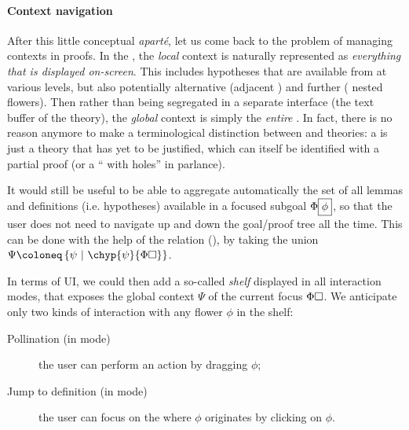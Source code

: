 \begin{scope}
\paragraph{Context navigation}

After this little conceptual \textit{aparté}, let us come back to the problem of
managing contexts in proofs. In the , the \emph{local} context is
naturally represented as \emph{everything that is displayed on-screen}. This
includes hypotheses that are available from  at various levels, but also
potentially alternative  (adjacent ) and further  (
nested flowers). Then rather than being segregated in a separate interface (the
text buffer of the theory), the \emph{global} context is simply the
\emph{entire} . In fact, there is no reason anymore to make a terminological
distinction between  and theories: a  is just a theory that has yet to
be justified, which can itself be identified with a partial proof (or a `` with holes'' in  parlance).

It would still be useful to be able to aggregate automatically the set of all
lemmas and definitions (i.e. hypotheses) available in a focused subgoal
$\Phi\fbox{$\phi$}$, so that the user does not need to navigate up and down the
goal/proof tree all the time. This can be done with the help of the 
relation (), by taking the union $\Psi \deq
\compr{\psi}{\chyp{\psi}{\Phi\hole}}$.

In terms of UI, we could then add a so-called \emph{shelf} displayed in all
interaction modes, that exposes the global context $\Psi$ of the current focus
$\Phi\square$. We anticipate only two kinds of interaction with any flower $\phi$
in the shelf:
\begin{description}
  \item[Pollination (in \Proof mode)] the user can perform an
   action by dragging $\phi$;
  \item[Jump to definition (in \Navigation mode)] the user can focus on
  the  where $\phi$ originates by clicking on $\phi$.
\end{description}


\end{scope}

